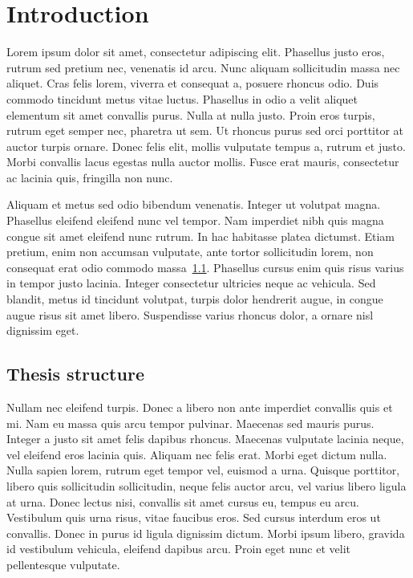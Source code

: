 \chapter{Introduction}
\label{section:introduction}

Lorem ipsum dolor sit amet, consectetur adipiscing elit. Phasellus justo eros,
rutrum sed pretium nec, venenatis id arcu. Nunc aliquam sollicitudin massa nec
aliquet. Cras felis lorem, viverra et consequat a, posuere rhoncus odio. Duis
commodo tincidunt metus vitae luctus. Phasellus in odio a velit aliquet
elementum sit amet convallis purus. Nulla at nulla justo. Proin eros turpis,
rutrum eget semper nec, pharetra ut sem. Ut rhoncus purus sed orci porttitor at
auctor turpis ornare. Donec felis elit, mollis vulputate tempus a, rutrum et
justo. Morbi convallis lacus egestas nulla auctor mollis. Fusce erat mauris,
consectetur ac lacinia quis, fringilla non nunc.

Aliquam et metus sed odio bibendum venenatis. Integer ut volutpat magna.
Phasellus eleifend eleifend nunc vel tempor. Nam imperdiet nibh quis magna
congue sit amet eleifend nunc rutrum. In hac habitasse platea dictumst. Etiam
pretium, enim non accumsan vulputate, ante tortor sollicitudin lorem, non
consequat erat odio commodo massa~\ref{section:introduction:structure}.
Phasellus cursus enim quis risus varius in tempor justo lacinia. Integer
consectetur ultricies neque ac vehicula. Sed blandit, metus id tincidunt
volutpat, turpis dolor hendrerit augue, in congue augue risus sit amet libero.
Suspendisse varius rhoncus dolor, a ornare nisl dignissim eget.

\section{Thesis structure}
\label{section:introduction:structure}

Nullam nec eleifend turpis. Donec a libero non ante imperdiet convallis quis et
mi. Nam eu massa quis arcu tempor pulvinar. Maecenas sed mauris purus. Integer a
justo sit amet felis dapibus rhoncus. Maecenas vulputate lacinia neque, vel
eleifend eros lacinia quis. Aliquam nec felis erat. Morbi eget dictum nulla.
Nulla sapien lorem, rutrum eget tempor vel, euismod a urna. Quisque porttitor,
libero quis sollicitudin sollicitudin, neque felis auctor arcu, vel varius
libero ligula at urna. Donec lectus nisi, convallis sit amet cursus eu, tempus
eu arcu. Vestibulum quis urna risus, vitae faucibus eros. Sed cursus interdum
eros ut convallis. Donec in purus id ligula dignissim dictum. Morbi ipsum
libero, gravida id vestibulum vehicula, eleifend dapibus arcu. Proin eget nunc
et velit pellentesque vulputate.

